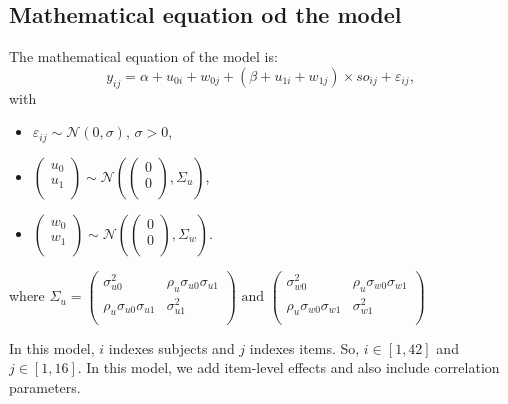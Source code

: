 \documentclass{article}
\begin{document}
\subsection{Mathematical equation od the model}
The mathematical equation of the model is:
\[y_{ij}= \alpha + u_{0i} + w_{0j}+(\beta + u_{1i} + w_{1j}) \times so_{ij} + \varepsilon_{ij},\]
with 
\begin{itemize}
    \item $\varepsilon_{ij} \sim \mathcal{N}(0, \sigma)$, $\sigma>0$,
    \item
    $\begin{pmatrix}
    u_0\\
    u_1\\
    \end{pmatrix}\sim \mathcal{N}\left(\begin{pmatrix}
    0\\
    0\\
    \end{pmatrix},\Sigma_u\right)$,
    \item 
    $\begin{pmatrix}
    w_0\\
    w_1\\
    \end{pmatrix}\sim \mathcal{N}\left(\begin{pmatrix}
    0\\
    0\\
    \end{pmatrix},\Sigma_w\right)$.
\end{itemize}
where $\Sigma_u=\begin{pmatrix}
\sigma_{u0}^2  & \rho_u\sigma_{u0}\sigma_{u1}\\
\rho_u\sigma_{u0}\sigma_{u1} & \sigma_{u1}^2\\
\end{pmatrix} \text{ and } \begin{pmatrix}
\sigma_{w0}^2  & \rho_u\sigma_{w0}\sigma_{w1}\\
\rho_u\sigma_{w0}\sigma_{w1} & \sigma_{w1}^2\\
\end{pmatrix} $

In this model, $i$ indexes subjects and $j$ indexes items. So, $i \in [1,42]$ and $j \in [1,16]$. 
In this model, we add item-level effects and also include correlation parameters.
\end{document}
